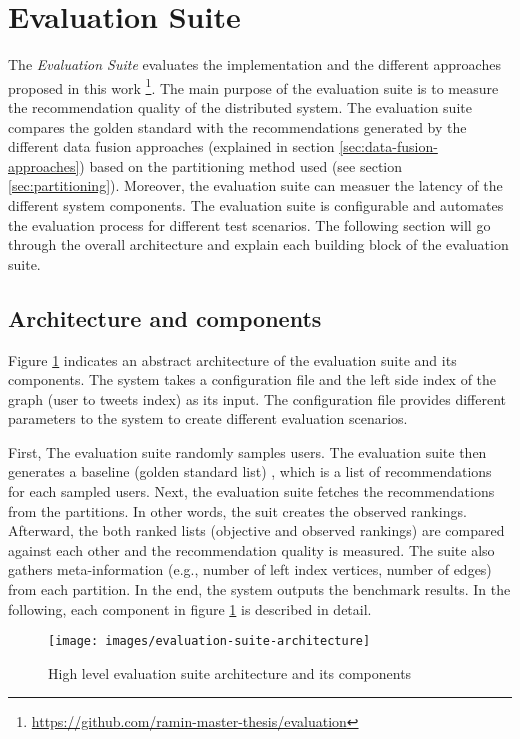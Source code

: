 \section{Evaluation Suite}
\label{sec:evaluation-suite}
The \emph{Evaluation Suite} evaluates the implementation and the different approaches proposed in this work \footnote{\url{https://github.com/ramin-master-thesis/evaluation}}. The main purpose of the evaluation suite is to measure the recommendation quality of the distributed system. The evaluation suite compares the golden standard with the recommendations generated by the different data fusion approaches (explained in section \ref{sec:data-fusion-approaches}) based on the partitioning method used (see section \ref{sec:partitioning}). Moreover, the evaluation suite can measuer the latency of the different system components. The evaluation suite is configurable and automates the evaluation process for different test scenarios. The following section will go through the overall architecture and explain each building block of the evaluation suite.


\subsection{Architecture and components}
\label{sec:eval-suite-architecture-components}
Figure \ref{fig:evaluation-suite-architecture} indicates an abstract architecture of the evaluation suite and its components. The system takes a configuration file and the left side index of the graph (user to tweets index) as its input. The configuration file provides different parameters to the system to create different evaluation scenarios. 


First, The evaluation suite randomly samples users. The evaluation suite then generates a baseline (golden standard list) , which is a list of recommendations for each sampled users. Next, the evaluation suite fetches the recommendations from the partitions. In other words, the suit creates the observed rankings. Afterward, the both ranked lists (objective and observed rankings) are compared against each other and the recommendation quality is measured. The suite also gathers meta-information (e.g., number of left index vertices, number of edges) from each partition. In the end, the system outputs the benchmark results. In the following, each component in figure \ref{fig:evaluation-suite-architecture} is described in detail.


\begin{figure}[!h]
    \centering
    \texttt{[image: images/evaluation-suite-architecture]}
    \caption{High level evaluation suite architecture and its components}
    \label{fig:evaluation-suite-architecture}
\end{figure}


